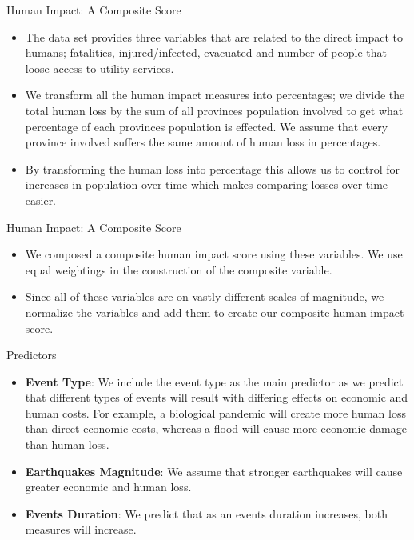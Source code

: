 \begin{frame}{Human Impact: A Composite Score}
	\begin{itemize}
		\item The data set provides three variables that are related to the direct impact to humans; fatalities, injured/infected, evacuated and number of people that loose access to utility services. 
\item We transform all the human impact measures into percentages; we divide the total human loss by the sum of all provinces population involved to get what percentage of each provinces population is effected. We assume that every province involved suffers the same amount of human loss in percentages. 
\item By transforming the human loss into percentage this allows us to control for increases in population over time which makes comparing losses over time easier.

	\end{itemize}
	
\end{frame}

\begin{frame}{Human Impact: A Composite Score}
\begin{itemize}

	\item We composed a composite human impact score using these variables. We use equal weightings in the construction of the composite variable.
	\item Since all of these variables are on vastly different scales of magnitude, we normalize the variables and add them to create our composite human impact score. 
\end{itemize}

\end{frame}

\begin{frame}{Predictors}
\begin{itemize}
	\item \textbf{Event Type}: We include the event type as the main predictor as we predict that different types of events will result with differing effects on economic and human costs. For example, a biological pandemic will create more human loss than direct economic costs, whereas a flood will cause more economic damage than human loss.
	\item \textbf{Earthquakes Magnitude}: We assume that stronger earthquakes will cause greater economic and human loss.
	\item \textbf{Events Duration}: We predict that as an events duration increases, both measures will increase. 

\end{itemize}
\end{frame}

